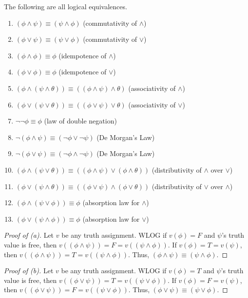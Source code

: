 \documentclass{article}
\theoremstyle{remark}\newtheorem{remark}{Remark}
\theoremstyle{plain}
\newenvironment{bookthm}[1]
  {\renewcommand\thebookthminner{#1}\bookthminner}
  {\endbookthminner}
\begin{document}
\begin{bookthm}{2.3}
The following are all logical equivalences.
\begin{enumerate}[label=\textup{(\alph*)}]
    \item $(\phi \land \psi) \equiv (\psi \land \phi)$ \quad (commutativity of $\land$)
    \item $(\phi \lor \psi) \equiv (\psi \lor \phi)$ \quad (commutativity of $\lor$)
    \item $(\phi \land \phi) \equiv \phi$ \quad (idempotence of $\land$)
    \item $(\phi \lor \phi) \equiv \phi$ \quad (idempotence of $\lor$)
    \item $(\phi \land (\psi \land \theta)) \equiv ((\phi \land \psi) \land \theta)$ \quad (associativity of $\land$)
    \item $(\phi \lor (\psi \lor \theta)) \equiv ((\phi \lor \psi) \lor \theta)$ \quad (associativity of $\lor$)
    \item $\neg\neg\phi \equiv \phi$ \quad (law of double negation)
    \item $\neg(\phi \land \psi) \equiv (\neg\phi \lor \neg\psi)$ \quad (De Morgan's Law)
    \item $\neg(\phi \lor \psi) \equiv (\neg\phi \land \neg\psi)$ \quad (De Morgan's Law)
    \item $(\phi \land (\psi \lor \theta)) \equiv ((\phi \land \psi) \lor (\phi \land \theta))$ \quad (distributivity of $\land$ over $\lor$)
    \item $(\phi \lor (\psi \land \theta)) \equiv ((\phi \lor \psi) \land (\phi \lor \theta))$ \quad (distributivity of $\lor$ over $\land$)
    \item $(\phi \land (\psi \lor \phi)) \equiv \phi$ \quad (absorption law for $\land$)
    \item $(\phi \lor (\psi \land \phi)) \equiv \phi$ \quad (absorption law for $\lor$)
\end{enumerate}
\end{bookthm}

\begin{proof}[Proof of (a)]
    Let $v$ be any truth assignment. WLOG if $v(\phi) = F$ and $\psi$'s truth value is free, then $v((\phi \land \psi)) = F = v((\psi \land \phi))$. If $v(\phi) = T = v(\psi)$, then $v((\phi \land \psi)) = T = v((\psi \land \phi))$. Thus, $(\phi \land \psi) \equiv (\psi \land \phi)$.
\end{proof}

\begin{proof}[Proof of (b)]
    Let $v$ be any truth assignment. WLOG if $v(\phi) = T$ and $\psi$'s truth value is free, then $v((\phi \lor \psi)) = T = v((\psi \lor \phi))$. If $v(\phi) = F = v(\psi)$, then $v((\phi \lor \psi)) = F = v((\psi \lor \phi))$. Thus, $(\phi \lor \psi) \equiv (\psi \lor \phi)$.
\end{proof}
\end{document}
